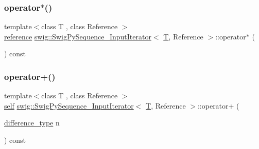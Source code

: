 \mbox{\label{structswig_1_1_swig_py_sequence___input_iterator_ae4b666bc083cefd86b9125f8e20c8d20}} 
\subsubsection{\texorpdfstring{operator$\ast$()}{operator*()}}
{\footnotesize\ttfamily template$<$class T , class Reference $>$ \\
\hyperlink{structswig_1_1_swig_py_sequence___input_iterator_a75f82d558aaa6781b77d34914eb0f455}{reference} \hyperlink{structswig_1_1_swig_py_sequence___input_iterator}{swig\+::\+Swig\+Py\+Sequence\+\_\+\+Input\+Iterator}$<$ \hyperlink{fmt_8h_a0acb682b8260ab1c60b918599864e2e5}{T}, Reference $>$\+::operator$\ast$ (\begin{DoxyParamCaption}{ }\end{DoxyParamCaption}) const\hspace{0.3cm}{\ttfamily [inline]}}

\mbox{\label{structswig_1_1_swig_py_sequence___input_iterator_ac9944e0170aff64c4a54eb0156e89839}} 
\subsubsection{\texorpdfstring{operator+()}{operator+()}}
{\footnotesize\ttfamily template$<$class T , class Reference $>$ \\
\hyperlink{structswig_1_1_swig_py_sequence___input_iterator_a3d3f028d1d9af412c61de2b5d8630321}{self} \hyperlink{structswig_1_1_swig_py_sequence___input_iterator}{swig\+::\+Swig\+Py\+Sequence\+\_\+\+Input\+Iterator}$<$ \hyperlink{fmt_8h_a0acb682b8260ab1c60b918599864e2e5}{T}, Reference $>$\+::operator+ (\begin{DoxyParamCaption}\item[{\hyperlink{structswig_1_1_swig_py_sequence___input_iterator_af5e5d3f2d1906ceaf05c2215ee388096}{difference\+\_\+type}}]{n }\end{DoxyParamCaption}) const\hspace{0.3cm}{\ttfamily [inline]}}

